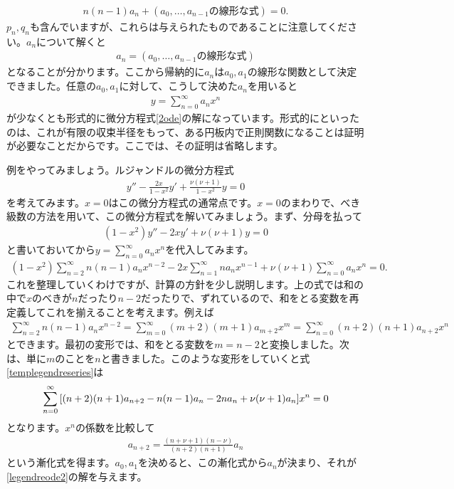 \documentclass[report,paper=a4, fontsize=12pt, line_length=16cm, number_of_lines=33,dvipdfmx]{jlreq}
\numberwithin{equation}{section}
\begin{document}
\begin{align}
  n(n-1)a_n+(a_0,\dots,a_{n-1}\text{の線形な式})=0.
\end{align}
$p_n,q_n$も含んでいますが、これらは与えられたものであることに注意してください。$a_n$について解くと
\begin{align}
  a_n=(a_0,\dots,a_{n-1}\text{の線形な式})
\end{align}
となることが分かります。ここから帰納的に$a_n$は$a_0,a_1$の線形な関数として決定できました。任意の$a_0,a_1$に対して、こうして決めた$a_n$を用いると
\begin{align}
  y=\sum_{n=0}^{\infty}a_nx^n
\end{align}
が少なくとも形式的に微分方程式\eqref{2ode}の解になっています。形式的にといったのは、これが有限の収束半径をもって、ある円板内で正則関数になることは証明が必要なことだからです。ここでは、その証明は省略します。

例をやってみましょう。ルジャンドルの微分方程式
\begin{align}
  y''-\frac{2x}{1-x^2}y'+\frac{\nu(\nu+1)}{1-x^2}y=0\label{legendreode2}
\end{align}
を考えてみます。$x=0$はこの微分方程式の通常点です。$x=0$のまわりで、べき級数の方法を用いて、この微分方程式を解いてみましょう。まず、分母を払って
\begin{align}
  (1-x^2)y''-2xy'+\nu(\nu+1)y=0
\end{align}
と書いておいてから$y=\sum_{n=0}^{\infty}a_nx^n$を代入してみます。
\begin{align}
  (1-x^2)\sum_{n=2}^{\infty} n(n-1)a_n x^{n-2}-2x\sum_{n=1}^{\infty} n a_n x^{n-1}
  +\nu(\nu+1)\sum_{n=0}^{\infty}a_n x^n=0.\label{templegendreseries}
\end{align}
これを整理していくわけですが、計算の方針を少し説明します。上の式では和の中で$x$のべきが$n$だったり$n-2$だったりで、ずれているので、和をとる変数を再定義してこれを揃えることを考えます。例えば
\begin{align}
  \sum_{n=2}^{\infty}n(n-1)a_nx^{n-2}
  =
  \sum_{m=0}^{\infty}(m+2)(m+1)a_{m+2}x^{m}
  =
  \sum_{n=0}^{\infty}(n+2)(n+1)a_{n+2}x^{n}
\end{align}
とできます。最初の変形では、和をとる変数を$m=n-2$と変換しました。次は、単に$m$のことを$n$と書きました。このような変形をしていくと式\eqref{templegendreseries}は
\begin{align}
  \sum_{n=0}^{\infty}\qty[
    (n+2)(n+1)a_{n+2}-n(n-1)a_n-2na_n+\nu(\nu+1)a_n
  ]x^n=0
\end{align}
となります。$x^n$の係数を比較して
\begin{align}
  a_{n+2}=\frac{(n+\nu+1)(n-\nu)}{(n+2)(n+1)}a_n\label{legendrerecursion}
\end{align}
という漸化式を得ます。$a_0,a_1$を決めると、この漸化式から$a_n$が決まり、それが\eqref{legendreode2}の解を与えます。
\end{document}
